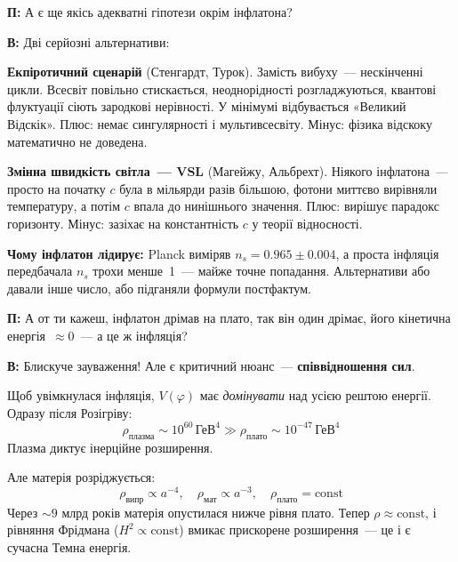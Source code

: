 \documentclass[12pt, a4paper]{article}
\newcommand{\Q}[1]{%
    \begin{questionbox}
        {\color{qcolor}\bfseries\sffamily П:} #1
    \end{questionbox}
}
\newcommand{\A}[1]{%
    \begin{answerbox}
        {\bfseries\sffamily В:} #1
    \end{answerbox}
}
\begin{document}
\Q{А є ще якісь адекватні гіпотези окрім інфлатона?}

\A{Дві серйозні альтернативи:

\textbf{Екпіротичний сценарій} (Стенгардт, Турок). Замість вибуху~--- нескінченні цикли. Всесвіт повільно стискається, неоднорідності розгладжуються, квантові флуктуації сіють зародкові нерівності. У мінімумі відбувається «Великий Відскік». Плюс: немає сингулярності і мультивсесвіту. Мінус: фізика відскоку математично не доведена.

\textbf{Змінна швидкість світла~--- VSL} (Магейжу, Альбрехт). Ніякого інфлатона~--- просто на початку $c$ була в мільярди разів більшою, фотони миттєво вирівняли температуру, а потім $c$ впала до нинішнього значення. Плюс: вирішує парадокс горизонту. Мінус: зазіхає на константність $c$ у теорії відносності.

\textbf{Чому інфлатон лідирує:} Planck виміряв $n_s = 0.965\pm0.004$, а проста інфляція передбачала $n_s$ трохи менше~1~--- майже точне попадання. Альтернативи або давали інше число, або підганяли формули постфактум.}


\Q{А от ти кажеш, інфлатон дрімав на плато, так він один дрімає, його кінетична енергія~$\approx 0$~--- а це ж інфляція?}

\A{Блискуче зауваження! Але є критичний нюанс~--- \textbf{співвідношення сил}.

Щоб увімкнулася інфляція, $V(\varphi)$ має \emph{домінувати} над усією рештою енергії. Одразу після Розігріву:
\begin{equation}
    \rho_\text{плазма} \sim 10^{60}\,\text{ГеВ}^4 \gg \rho_\text{плато} \sim 10^{-47}\,\text{ГеВ}^4
\end{equation}
Плазма диктує інерційне розширення.

Але матерія розріджується:
\begin{equation}
    \rho_\text{випр} \propto a^{-4}, \quad
    \rho_\text{мат} \propto a^{-3}, \quad
    \rho_\text{плато} = \text{const}
\end{equation}
Через $\sim9$ млрд років матерія опустилася нижче рівня плато. Тепер $\rho \approx \text{const}$, і рівняння Фрідмана ($H^2 \propto \text{const}$) вмикає прискорене розширення~--- це і є сучасна Темна енергія.}
\end{document}
